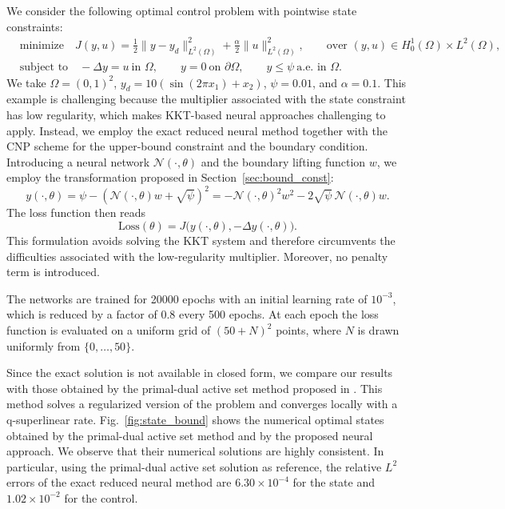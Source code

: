 \documentclass{article}
\numberwithin{equation}{section}
\begin{document}
We consider the following optimal control problem with pointwise state constraints\cite{hintermuller2006feasible}:
\begin{align*}
&\text{minimize}\quad J(y,u)
=
\frac12\|y-y_d\|_{L^2(\Omega)}^2
+
\frac{\alpha}{2}\|u\|_{L^2(\Omega)}^2, 
\qquad \text{over }
(y,u)\in H_0^1(\Omega)\times L^2(\Omega),\\
&\text{subject to}\quad
-\Delta y=u \ \text{in }\Omega,
\qquad
y=0 \ \text{on }\partial\Omega,
\qquad
y\le\psi \ \text{a.e. in }\Omega .
\end{align*}
We take $\Omega=(0,1)^2$, $y_d=10(\sin(2\pi x_1)+x_2)$, $\psi=0.01$, and $\alpha=0.1$. This example is challenging because the multiplier associated with the state constraint has low regularity\cite{hintermuller2006feasible}, which makes KKT-based neural approaches challenging to apply. Instead, we employ the exact reduced neural method together with the CNP scheme for the upper-bound constraint and the boundary condition. Introducing a neural network $\mathcal N(\cdot,\theta)$ and the boundary lifting function $w$, we employ the transformation proposed in Section~\ref{sec:bound_const}:
\begin{equation}
    y(\cdot,\theta)
=
\psi-(\mathcal N(\cdot,\theta)w+\sqrt{\psi})^2
=
-\mathcal N(\cdot,\theta)^2 w^2
-
2\sqrt{\psi}\,\mathcal N(\cdot,\theta)w .
\end{equation}
The loss function then reads
\begin{equation}
\label{equa:CNP_low_r}
\text{Loss}(\theta)
=
J\big(y(\cdot,\theta),-\Delta y(\cdot,\theta)\big).
\end{equation}
This formulation avoids solving the KKT system and therefore circumvents the difficulties associated with the low-regularity multiplier. Moreover, no penalty term is introduced.

The networks are trained for 20000 epochs with an initial learning rate of $10^{-3}$, which is reduced by a factor of $0.8$ every 500 epochs. At each epoch the loss function is evaluated on a uniform grid of $(50+N)^2$ points, where $N$ is drawn uniformly from $\{0,\ldots,50\}$.

Since the exact solution is not available in closed form, we compare our results with those obtained by the primal-dual active set method proposed in \cite{hintermuller2006path}. This method solves a regularized version of the problem and converges locally with a q-superlinear rate. Fig.~\ref{fig:state_bound} shows the numerical optimal states obtained by the primal-dual active set method and by the proposed neural approach. We observe that their numerical solutions are highly consistent. In particular, using the primal-dual active set solution as reference, the
relative $L^2$ errors of the exact reduced neural method are
$6.30\times 10^{-4}$ for the state and $1.02\times 10^{-2}$ for the control.
\end{document}
